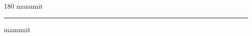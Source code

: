 
\begin{frame}
\begin{center}
\begin{turn}{180}
{\fontsize{2.5cm}{1em}\selectfont manumit}
\end{turn}
\vspace{1em}\par  
\hrule
\vspace{1em}\par  
{\fontsize{2.5cm}{1em}\selectfont manumit}
\end{center}
\end{frame}
